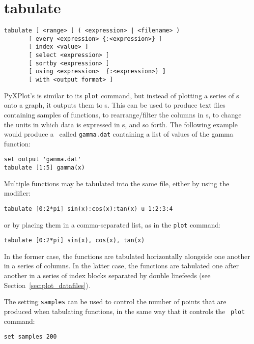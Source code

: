 \section{tabulate}

\begin{verbatim}
tabulate [ <range> ] ( <expression> | <filename> )
       [ every <expression> {:<expression>} ]
       [ index <value> ]
       [ select <expression> ]
       [ sortby <expression> ]
       [ using <expression>  {:<expression>} ]
       [ with <output format> ]
\end{verbatim}

PyXPlot's  is similar to its {\tt plot} command, but instead
of plotting a series of \datapoint s onto a graph, it outputs them to \datafile
s. This can be used to produce text files containing samples of functions, to
rearrange/filter the columns in \datafile s, to change the units in which data
is expressed in \datafile s, and so forth.  The following example would produce
a \datafile\ called {\tt gamma.dat} containing a list of values of the gamma
function:

\begin{verbatim}
set output 'gamma.dat'
tabulate [1:5] gamma(x)
\end{verbatim}

\noindent Multiple functions may be tabulated into the same file, either by
using the  modifier:

\begin{verbatim}
tabulate [0:2*pi] sin(x):cos(x):tan(x) u 1:2:3:4
\end{verbatim}

\noindent or by placing them in a comma-separated list, as in the {\tt plot}
command:

\begin{verbatim}
tabulate [0:2*pi] sin(x), cos(x), tan(x)
\end{verbatim}

In the former case, the functions are tabulated horizontally alongside one
another in a series of columns. In the latter case, the functions are tabulated
one after another in a series of index blocks separated by double linefeeds
(see Section~\ref{sec:plot_datafiles}).

The setting {\tt samples} can be used to control the number of points that are
produced when tabulating functions, in the same way that it controls the {\tt
plot} command:

\begin{verbatim}
set samples 200
\end{verbatim}

